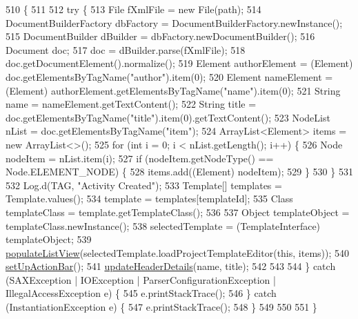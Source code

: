\begin{DoxyCode}
510                                                \{
511 
512         \textcolor{keywordflow}{try} \{
513             File fXmlFile = \textcolor{keyword}{new} File(path);
514             DocumentBuilderFactory dbFactory = DocumentBuilderFactory.newInstance();
515             DocumentBuilder dBuilder = dbFactory.newDocumentBuilder();
516             Document doc;
517             doc = dBuilder.parse(fXmlFile);
518             doc.getDocumentElement().normalize();
519             Element authorElement = (Element) doc.getElementsByTagName(\textcolor{stringliteral}{"author"}).item(0);
520             Element nameElement = (Element) authorElement.getElementsByTagName(\textcolor{stringliteral}{"name"}).item(0);
521             String name = nameElement.getTextContent();
522             String title = doc.getElementsByTagName(\textcolor{stringliteral}{"title"}).item(0).getTextContent();
523             NodeList nList = doc.getElementsByTagName(\textcolor{stringliteral}{"item"});
524             ArrayList<Element> items = \textcolor{keyword}{new} ArrayList<>();
525             \textcolor{keywordflow}{for} (\textcolor{keywordtype}{int} i = 0; i < nList.getLength(); i++) \{
526                 Node nodeItem = nList.item(i);
527                 \textcolor{keywordflow}{if} (nodeItem.getNodeType() == Node.ELEMENT\_NODE) \{
528                     items.add((Element) nodeItem);
529                 \}
530             \}
531 
532             Log.d(TAG, \textcolor{stringliteral}{"Activity Created"});
533             Template[] templates = Template.values();
534             \textcolor{keyword}{template} = templates[templateId];
535             Class templateClass = template.getTemplateClass();
536 
537             Object templateObject = templateClass.newInstance();
538             selectedTemplate = (TemplateInterface) templateObject;
539             \hyperlink{classorg_1_1buildmlearn_1_1toolkit_1_1activity_1_1TemplateEditor_ade293345372081f3d43450df42e26092}{populateListView}(selectedTemplate.loadProjectTemplateEditor(\textcolor{keyword}{this}, items));
540             \hyperlink{classorg_1_1buildmlearn_1_1toolkit_1_1activity_1_1TemplateEditor_a5bd38be8a926fff23a40e8014b71cb13}{setUpActionBar}();
541             \hyperlink{classorg_1_1buildmlearn_1_1toolkit_1_1activity_1_1TemplateEditor_a3d785b7595c43249fc5a73e4f69daf41}{updateHeaderDetails}(name, title);
542 
543 
544         \} \textcolor{keywordflow}{catch} (SAXException | IOException | ParserConfigurationException | IllegalAccessException e) \{
545             e.printStackTrace();
546         \} \textcolor{keywordflow}{catch} (InstantiationException e) \{
547             e.printStackTrace();
548         \}
549 
550 
551     \}
\end{DoxyCode}
